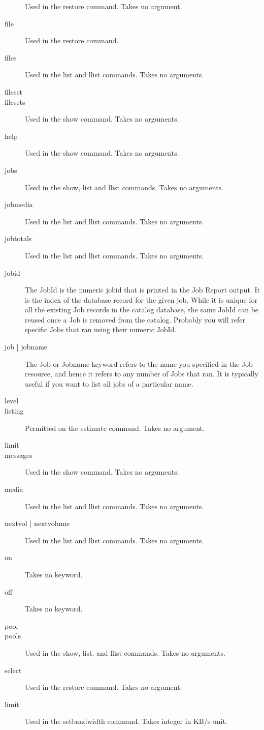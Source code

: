 \begin{description}
  Used in the restore command. Takes no argument.
\item [file]
  Used in the restore command.
\item [files]
  Used in the list and llist commands. Takes no arguments.
\item [fileset]
\item [filesets]
  Used in the show command. Takes no arguments.
\item [help]
  Used in the show command. Takes no arguments.
\item [jobs]
  Used in the show, list and llist commands. Takes no arguments.
\item [jobmedia]
  Used in the list and llist commands. Takes no arguments.
\item [jobtotals]
  Used in the list and llist commands. Takes no arguments.
\item [jobid]
  The JobId is the numeric jobid that is printed in the Job
  Report output. It is the index of the database record for the
  given job. While it is unique for all the existing Job records
  in the catalog database, the same JobId can be reused once a
  Job is removed from the catalog. Probably you will refer
  specific Jobs that ran using their numeric JobId.
\item [job | jobname]
  The Job or Jobname keyword refers to the name you specified
  in the Job resource, and hence it refers to any number of
  Jobs that ran.  It is typically useful if you want to list
  all jobs of a particular name.
\item [level]
\item [listing]
  Permitted on the estimate command. Takes no argument.
\item [limit]
\item [messages]
  Used in the show command. Takes no arguments.
\item [media]
  Used in the list and llist commands. Takes no arguments.
\item [nextvol | nextvolume]
  Used in the list and llist commands. Takes no arguments.
\item [on]
  Takes no keyword.
\item [off]
  Takes no keyword.
\item [pool]
\item [pools]
  Used in the show, list, and llist commands. Takes no arguments.
\item [select]
  Used in the restore command. Takes no argument.
\item[limit]
  Used in the setbandwidth command. Takes integer in KB/s unit.

\end{description}
